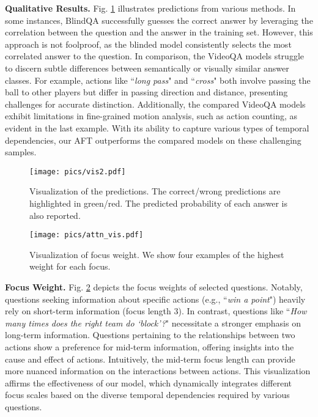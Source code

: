 \noindent \textbf{Qualitative Results.} Fig. \ref{pred} illustrates predictions from various methods. In some instances, BlindQA successfully guesses the correct answer by leveraging the correlation between the question and the answer in the training set. However, this approach is not foolproof, as the blinded model consistently selects the most correlated answer to the question.
In comparison, the VideoQA models struggle to discern subtle differences between semantically or visually similar answer classes. For example, actions like ``\textit{long pass}" and ``\textit{cross}" both involve passing the ball to other players but differ in passing direction and distance, presenting challenges for accurate distinction. Additionally, the compared VideoQA models exhibit limitations in fine-grained motion analysis, such as action counting, as evident in the last example. With its ability to capture various types of temporal dependencies, our AFT outperforms the compared models on these challenging samples.

\begin{figure}[tbp]
\centering
\texttt{[image: pics/vis2.pdf]}
\caption{
Visualization of the predictions. The correct/wrong predictions are highlighted in \textcolor[RGB]{84,130,53}{green}/\textcolor[RGB]{192,0,0}{red}. The predicted probability of each answer is also reported. 
}
\label{pred}
\end{figure}

\begin{figure}[tbp]
\centering
\texttt{[image: pics/attn\_vis.pdf]}
\caption{Visualization of focus weight. We show four examples of the highest weight for each focus.}
\label{attn_vis}
\end{figure}

\noindent\textbf{Focus Weight.}
Fig. \ref{attn_vis} depicts the focus weights of selected questions. Notably, questions seeking information about specific actions (e.g., ``\textit{win a point}") heavily rely on short-term information (focus length 3). In contrast, questions like ``\textit{How many times does the right team do `block'?}" necessitate a stronger emphasis on long-term information. Questions pertaining to the relationships between two actions show a preference for mid-term information, offering insights into the cause and effect of actions. Intuitively, the mid-term focus length can provide more nuanced information on the interactions between actions. This visualization affirms the effectiveness of our model, which dynamically integrates different focus scales based on the diverse temporal dependencies required by various questions.

